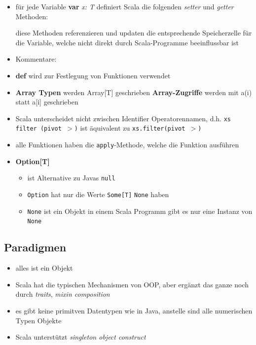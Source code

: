 \begin{itemize}
  
  \item für jede Variable \textbf{var} \textit{x: T} definiert Scala
  die folgenden \textit{setter} und \textit{getter} Methoden:
  
  
  
  diese Methoden referenzieren und updaten die entsprechende Speicherzelle für
  die Variable, welche nicht direkt durch Scala-Programme beeinflussbar ist
  \item Kommentare:

  \item \textbf{def} wird zur Festlegung von Funktionen verwendet
  \item \textbf{Array Typen} werden Array[T] geschrieben \und 
  \textbf{Array-Zugriffe} werden mit a(i) statt a[i] geschrieben
  \item Scala unterscheidet nicht zwischen Identifier \und Operatorennamen,
  d.h. \texttt{xs filter (pivot $>$)} ist äquivalent zu 
  \texttt{xs.filter(pivot $>$)}
  \item alle Funktionen haben die \texttt{apply}-Methode, welche die 
  Funktion ausführen
  \item \textbf{Option[T]}
  \begin{itemize}
    \item ist Alternative zu Javas \texttt{null}
    \item \texttt{Option} hat nur die Werte \texttt{Some[T]} \oder 
    \texttt{None} haben
    \item \texttt{None} ist ein Objekt \und in einem Scala Programm gibt es
    nur eine Instanz von \texttt{None}
  \end{itemize}
\end{itemize}
  

\subsection{Paradigmen}



\begin{itemize}
  \item alles ist ein Objekt
  \item Scala hat die typischen Mechanismen von OOP, aber ergänzt das ganze
  noch durch \textit{traits}, \textit{mixin composition}
  \item es gibt keine primitven Datentypen wie in Java, anstelle sind alle 
  numerischen Typen Objekte
  \item Scala unterstützt \textit{singleton object construct}
\end{itemize}


